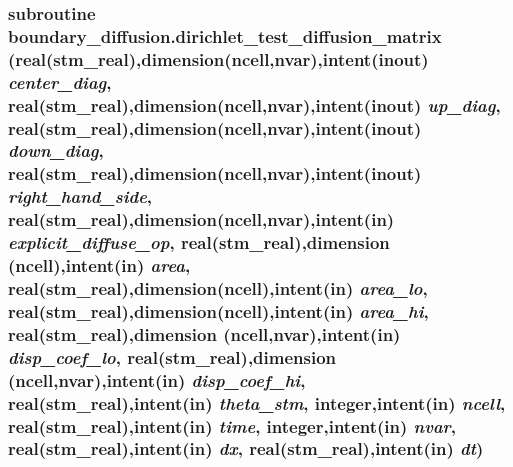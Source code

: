 \hypertarget{a00054_97261dd167325efeaa30024f80daf5c7}{
\subsubsection[{dirichlet\_\-test\_\-diffusion\_\-matrix}]{\setlength{\rightskip}{0pt plus 5cm}subroutine boundary\_\-diffusion.dirichlet\_\-test\_\-diffusion\_\-matrix (real(stm\_\-real),dimension(ncell,nvar),intent(inout) {\em center\_\-diag}, \/  real(stm\_\-real),dimension(ncell,nvar),intent(inout) {\em up\_\-diag}, \/  real(stm\_\-real),dimension(ncell,nvar),intent(inout) {\em down\_\-diag}, \/  real(stm\_\-real),dimension(ncell,nvar),intent(inout) {\em right\_\-hand\_\-side}, \/  real(stm\_\-real),dimension(ncell,nvar),intent(in) {\em explicit\_\-diffuse\_\-op}, \/  real(stm\_\-real),dimension (ncell),intent(in) {\em area}, \/  real(stm\_\-real),dimension(ncell),intent(in) {\em area\_\-lo}, \/  real(stm\_\-real),dimension(ncell),intent(in) {\em area\_\-hi}, \/  real(stm\_\-real),dimension (ncell,nvar),intent(in) {\em disp\_\-coef\_\-lo}, \/  real(stm\_\-real),dimension (ncell,nvar),intent(in) {\em disp\_\-coef\_\-hi}, \/  real(stm\_\-real),intent(in) {\em theta\_\-stm}, \/  integer,intent(in) {\em ncell}, \/  real(stm\_\-real),intent(in) {\em time}, \/  integer,intent(in) {\em nvar}, \/  real(stm\_\-real),intent(in) {\em dx}, \/  real(stm\_\-real),intent(in) {\em dt})}}
\label{a00054_97261dd167325efeaa30024f80daf5c7}



